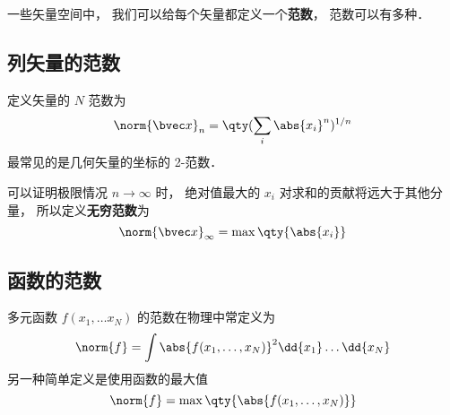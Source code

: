 

一些矢量空间中， 我们可以给每个矢量都定义一个\textbf{范数}， 范数可以有多种．

\subsection{列矢量的范数}
定义矢量的 $N$ 范数为
\begin{equation}
\norm{\bvec x}_n = \qty(\sum_i \abs{x_i}^n)^{1/n}
\end{equation}
最常见的是几何矢量的坐标的 2-范数．


可以证明极限情况 $n \to \infty$ 时， 绝对值最大的 $x_i$ 对求和的贡献将远大于其他分量， 所以定义\textbf{无穷范数}为
\begin{equation}
\norm{\bvec x}_\infty = \max \qty{\abs{x_i}}
\end{equation}

\subsection{函数的范数}
多元函数 $f(x_1, \dots x_N)$ 的范数在物理中常定义为
\begin{equation}
\norm{f} = \int \abs{f(x_1, \dots, x_N)}^2 \dd{x_1}\dots \dd{x_N}
\end{equation}
另一种简单定义是使用函数的最大值
\begin{equation}
\norm{f} = \max\qty{\abs{f(x_1, \dots, x_N)}}
\end{equation}
